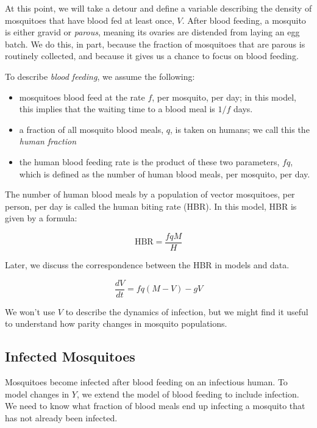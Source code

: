 \documentclass[
]{book}
\begin{document}
At this point, we will take a detour and define a variable describing the density of mosquitoes that have blood fed at least once, \(V\). After blood feeding, a mosquito is either gravid or \emph{parous}, meaning its ovaries are distended from laying an egg batch. We do this, in part, because the fraction of mosquitoes that are parous is routinely collected, and because it gives us a chance to focus on blood feeding.

To describe \emph{blood feeding}, we assume the following:

\begin{itemize}
\item
  mosquitoes blood feed at the rate \(f\), per mosquito, per day; in this model, this implies that the waiting time to a blood meal is \(1/f\) days.
\item
  a fraction of all mosquito blood meals, \(q\), is taken on humans; we call this the \emph{human fraction}
\item
  the human blood feeding rate is the product of these two parameters, \(fq\), which is defined as the number of human blood meals, per mosquito, per day.
\end{itemize}

The number of human blood meals by a population of vector mosquitoes, per person, per day is called the human biting rate (HBR). In this model, HBR is given by a formula:

\[\mbox{HBR} = \frac{fqM}{H}\]

Later, we discuss the correspondence between the HBR in models and data.

\begin{equation}
\frac{dV}{dt} = f q (M-V) - g V
\end{equation}

We won't use \(V\) to describe the dynamics of infection, but we might find it useful to understand how parity changes in mosquito populations.

\hypertarget{infected-mosquitoes}{%
\subsection{Infected Mosquitoes}\label{infected-mosquitoes}}

Mosquitoes become infected after blood feeding on an infectious human. To model changes in \(Y\), we extend the model of blood feeding to include infection. We need to know what fraction of blood meals end up infecting a mosquito that has not already been infected.
\end{document}
